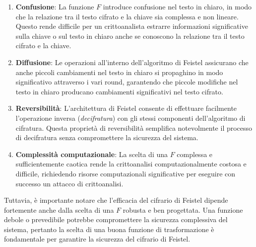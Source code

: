 \begin{enumerate}
  \item \textbf{Confusione}: La funzione \(F\) introduce confusione nel
  testo in chiaro, in modo che la relazione tra il testo cifrato e la
  chiave sia complessa e non lineare. Questo rende difficile per un
  crittoanalista estrarre informazioni significative sulla chiave o sul
  testo in chiaro anche se conoscono la relazione tra il testo cifrato
  e la chiave.
  \item \textbf{Diffusione}: Le operazioni all'interno dell'algoritmo di
  Feistel assicurano che anche piccoli cambiamenti nel testo in chiaro
  si propaghino in modo significativo attraverso i vari round, garantendo
  che piccole modifiche nel testo in chiaro producano cambiamenti
  significativi nel testo cifrato.
  \item \textbf{Reversibilità}: L'architettura di Feistel consente di
  effettuare facilmente l'operazione inversa (\textit{decifratura}) con
  gli stessi
  componenti dell'algoritmo di cifratura. Questa proprietà di reversibilità
  semplifica notevolmente il processo di decifratura senza compromettere
  la sicurezza del sistema.
  \item \textbf{Complessità computazionale}: La scelta di una \(F\) complessa
  e sufficientemente caotica rende la crittoanalisi computazionalmente
  costosa e difficile, richiedendo risorse computazionali significative
  per eseguire con successo un attacco di crittoanalisi.
\end{enumerate}

Tuttavia, è importante notare che l'efficacia del cifrario di Feistel
dipende fortemente anche dalla scelta di una \(F\) robusta e ben progettata.
Una funzione debole o prevedibile potrebbe compromettere la sicurezza
complessiva del sistema, pertanto la scelta di una buona funzione di
trasformazione è fondamentale per garantire la sicurezza del cifrario di
Feistel.
